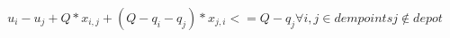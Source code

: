 \documentclass[preprint,review, 11pt,3p,authoryear]{elsarticle}
\begin{document}
\begin{equation}
  \label{eq07}
   u_{i} - u_{j} + Q * x_{i,j}+ (Q-q_i-q_j) * x_{j,i}<= Q - q_{j} \forall  i,j  \in dempoints  j \not\in depot
  \end{equation}


 







  
  
\end{document}
